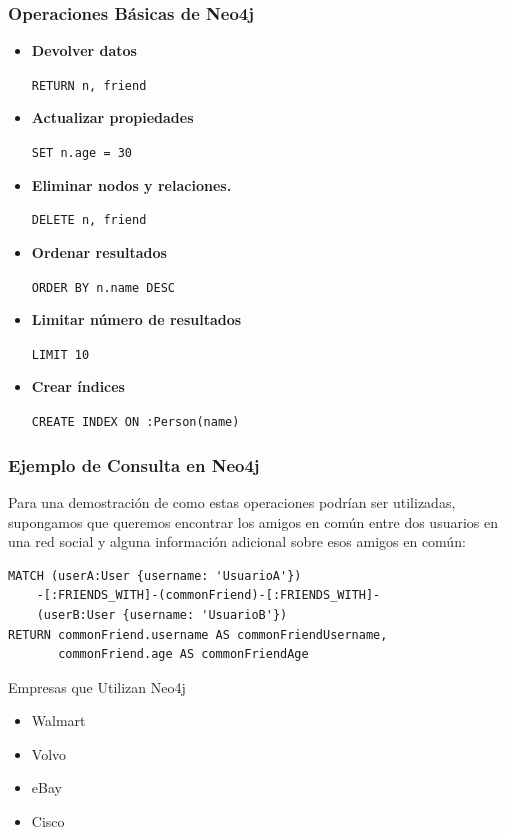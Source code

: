 \begin{frame}
    \frametitle{Operaciones Básicas de Neo4j}


    \begin{itemize}

     
        \item \textbf{Devolver datos}

        \texttt{RETURN n, friend}

         
         
        \item \textbf{Actualizar propiedades}

        \texttt{SET n.age = 30}

         
        
        \item \textbf{Eliminar nodos y relaciones.}

        \texttt{DELETE n, friend}

         
            
        \item \textbf{Ordenar resultados}

        \texttt{ORDER BY n.name DESC}

         
        
        \item \textbf{Limitar número de resultados}

        \texttt{LIMIT 10}

         

        \item \textbf{Crear índices}

        \texttt{CREATE INDEX ON :Person(name)}
    
        
    \end{itemize}
    
\end{frame}

\begin{frame}[fragile]
  \frametitle{Ejemplo de Consulta en Neo4j}
      Para una demostración de como estas operaciones podrían ser utilizadas, supongamos que queremos encontrar los amigos en común entre dos usuarios en una red social y alguna información adicional sobre esos amigos en común:  
    \begin{verbatim}
MATCH (userA:User {username: 'UsuarioA'})
    -[:FRIENDS_WITH]-(commonFriend)-[:FRIENDS_WITH]-
    (userB:User {username: 'UsuarioB'})
RETURN commonFriend.username AS commonFriendUsername,
       commonFriend.age AS commonFriendAge
    \end{verbatim}

        
\end{frame}

\begin{frame}{Empresas que Utilizan Neo4j}
    \begin{itemize}
        \item Walmart
        \item Volvo
        \item eBay
        \item Cisco
    \end{itemize}
\end{frame}